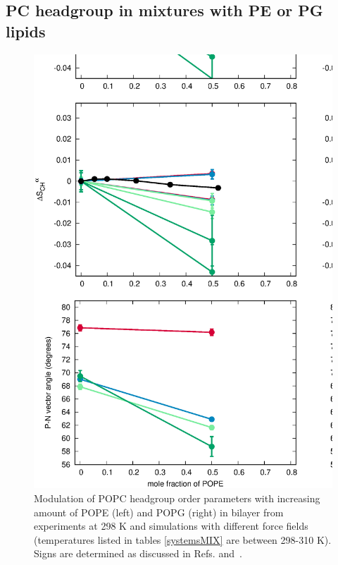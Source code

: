 \documentclass[journal=jpcbfk]{achemso}
\begin{document}
\clearpage

\subsection{PC headgroup in mixtures with PE or PG lipids}
\begin{figure}[]
  \centering
  \includegraphics[width=16.0cm]{./Figs/HGorderparametersPCvsPEPG.eps}
  \caption{\label{HGorderparametersPCvsPEPG}
    Modulation of POPC headgroup order parameters with increasing amount of POPE (left) and POPG (right) in bilayer
    from experiments at 298 K \cite{scherer87,macdonald87} and simulations with different force fields
    (temperatures listed in tables \ref{systemsMIX} are between 298-310 K).
    Signs are determined as discussed in Refs.  and~.
  }
\end{figure}
\end{document}
